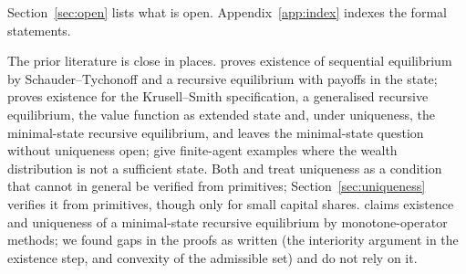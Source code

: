 \noindent
Section~\ref{sec:open} lists what is open. Appendix~\ref{app:index} indexes the formal statements.

The prior literature is close in places. \citet{miao2006} proves existence of sequential equilibrium
by Schauder--Tychonoff and a recursive equilibrium with payoffs in the state; \citet{cao2020} proves
existence for the Krusell--Smith specification, a generalised recursive equilibrium, the value
function as extended state and, under uniqueness, the minimal-state recursive equilibrium, and
leaves the minimal-state question without uniqueness open; \citet{kublerschmedders2002} give
finite-agent examples where the wealth distribution is not a sufficient state. Both
\citet{miao2006} and \citet{kublerschmedders2002} treat uniqueness as a condition that cannot in
general be verified from primitives; Section~\ref{sec:uniqueness} verifies it from primitives, though
only for small capital shares. \citet{prohl2025} claims existence and uniqueness of a minimal-state recursive equilibrium by
monotone-operator methods; we found gaps in the proofs as written (the interiority argument in the
existence step, and convexity of the admissible set) and do not rely on it.
